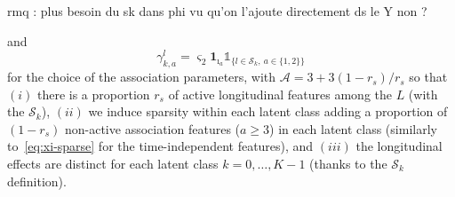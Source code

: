 \documentclass[11pt]{article}
\newcommand{\ind}[1]{\mathds{1}_{#1}}
\newcommand{\cA}{\mathcal A}
\newcommand{\cS}{\mathcal S}
\begin{document}
rmq : plus besoin du sk dans phi vu qu'on l'ajoute directement ds le Y non ?

and 
\begin{equation}
  \label{eq:gamma-sparse}
  \gamma_{k,a}^l = \varsigma_2 \mathbf{1}_{\imath_a} \ind{\big\{l \in \cS_k,\ a\in \{1, 2\} \big\}}
\end{equation}
for the choice of the association parameters, with $\cA = 3 + 3(1-r_s)/r_s$ so that $(i)$ there is a proportion $r_s$ of active longitudinal features among the $L$ (with the $\cS_k$), $(ii)$ we induce sparsity within each latent class adding a proportion of $(1-r_s)$ non-active association features ($a \geq 3$) in each latent class (similarly to~\eqref{eq:xi-sparse} for the time-independent features), and $(iii)$ the longitudinal effects are distinct for each latent class $k=0, \ldots, K-1$ (thanks to the $\cS_k$ definition).
\end{document}
